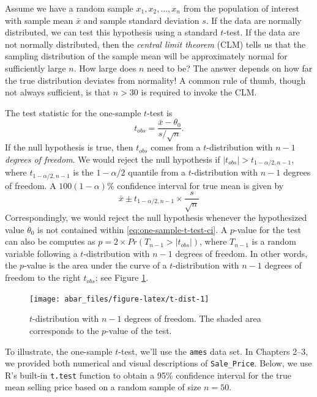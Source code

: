 \documentclass[]{book}
\theoremstyle{definition}
\theoremstyle{definition}
\theoremstyle{definition}
\theoremstyle{remark}
\begin{document}
Assume we have a random sample \(x_1, x_2, \dots, x_n\) from the
population of interest with sample mean \(\bar{x}\) and sample standard
deviation \(s\). If the data are normally distributed, we can test this
hypothesis using a standard \(t\)-test. If the data are not normally
distributed, then the \emph{central limit theorem} (CLM) tells us that
the sampling distribution of the sample mean will be approximately
normal for sufficiently large \(n\). How large does \(n\) need to be?
The answer depends on how far the true distribution deviates from
normality! A common rule of thumb, though not always sufficient, is that
\(n > 30\) is required to invoke the CLM.

The test statistic for the one-sample \(t\)-test is \[
  t_{obs} = \frac{\bar{x} - \theta_0}{s / \sqrt{n}}.
\] If the null hypothesis is true, then \(t_{obs}\) comes from a
\(t\)-distribution with \(n - 1\) \emph{degrees of freedom}. We would
reject the null hypothesis if \(|t_{obs}| > t_{1 - \alpha / 2, n - 1}\),
where \(t_{1 - \alpha / 2, n - 1}\) is the \(1 - \alpha / 2\) quantile
from a \(t\)-distribution with \(n - 1\) degrees of freedom. A
\(100\left(1 - \alpha\right)\)\% confidence interval for true mean is
given by \begin{equation}
  \bar{x} \pm t_{1 - \alpha / 2, n - 1} \times \frac{s}{\sqrt{n}}
  \label{eq:one-sample-t-test-ci}
\end{equation} Correspondingly, we would reject the null hypothesis
whenever the hypothesized value \(\theta_0\) is not contained within
\eqref{eq:one-sample-t-test-ci}. A \(p\)-value for the test can also be
computes as \(p = 2 \times Pr\left(T_{n - 1} > |t_{obs}|\right)\), where
\(T_{n - 1}\) is a random variable following a \(t\)-distribution with
\(n - 1\) degrees of freedom. In other words, the \(p\)-value is the
area under the curve of a \(t\)-distribution with \(n - 1\) degrees of
freedom to the right \(t_{obs}\); see Figure \ref{fig:t-dist}.

\begin{figure}

{\centering \texttt{[image: abar\_files/figure-latex/t-dist-1]} 

}

\caption{$t$-distribution with $n - 1$ degrees of freedom. The shaded area corresponds to the $p$-value of the test.}\label{fig:t-dist}
\end{figure}

To illustrate, the one-sample \(t\)-test, we'll use the \texttt{ames}
data set. In Chapters 2--3, we provided both numerical and visual
descriptions of \texttt{Sale\_Price}. Below, we use R's built-in
\texttt{t.test} function to obtain a 95\% confidence interval for the
true mean selling price based on a random sample of size \(n = 50\).
\end{document}
